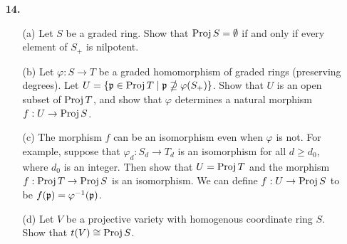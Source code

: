 \documentclass{article}
\begin{document}
\begin{enumerate} [label=\textbf{\arabic*.}, leftmargin=0em]
\begin{proof}
\begin{itemize} [leftmargin=0cm]
        \item[(b)] Let $\{ U_i \}_{i \in I}$ be an open cover of $\spec{A}$. We can assume $U_i$ to be basic open sets of the form $D(f_i)$ for some $f_i \in A$. If $\spec{A} = \bigcup D(f_i)$, then $V((f_i)_{i \in I}) = \emptyset$, which implies the ideal generated by $f_i$ is the entire ring $A$. That means there exists a finite number of elements $f_1, \dots f_n$ such that $\sum_{i = 1}^n a_i f_i = 1$ for some $a_i \in A$, hence $D(f_1), \dots, D(f_n)$ is a finite subcover of $\spec{A}$.

        \item[(c)] The descending chain of irreducible closed subsets in $\text{sp}(\spec{A})$ corresponds to an ascending chain of prime ideals in $A$. If $A$ is noetherian any ascending chain of ideals must terminate, hence the corresponding descending chain of irreducible closed subsets must terminate.

        \item[(d)] Let $A = \prod_{i = 1}^\infty k$, where $k$ is any field. The prime ideals of $A$ are of the form $\goth{p}_i = \cdots \times k \times 0 \times k \cdots$, so $\spec{A}$ has countably infinite number of points, and closed subsets of $\spec{A}$ are finite set of points. Hence, $\spec{A}$ is a noetherian topological space. However, $A$ itself is not noetherian, e.g. $0 \times 0 \times \cdots \subset k \times 0 \times 0 \times \cdots \subset k \times k \times 0 \times \cdots \subset \cdots$.
    \end{itemize}
\end{proof}

\item[\textbf{14.}]
\begin{itemize}
    \item[(a)] Let $S$ be a graded ring. Show that $\operatorname{Proj}{S} = \emptyset$ if and only if every element of $S_+$ is nilpotent.
    \item[(b)] Let $\varphi : S \to T$ be a graded homomorphism of graded rings (preserving degrees). Let $U = \{ \mathfrak{p} \in \operatorname{Proj}{T} \mid \mathfrak{p} \nsupseteq \varphi(S_+) \}$. Show that $U$ is an open subset of $\operatorname{Proj}{T}$, and show that $\varphi$ determines a natural morphism $f : U \to \operatorname{Proj}{S}$.
    \item[(c)] The morphism $f$ can be an isomorphism even when $\varphi$ is not. For example, suppose that $\varphi_d : S_d \to T_d$ is an isomorphism for all $d \geq d_0$, where $d_0$ is an integer. Then show that $U = \operatorname{Proj}{T}$ and the morphism $f : \operatorname{Proj}{T} \to \operatorname{Proj}{S}$ is an isomorphism. We can define $f : U \to \operatorname{Proj}{S}$ to be $f(\mathfrak{p}) = \varphi^{-1}(\mathfrak{p})$.
    \item[(d)] Let $V$ be a projective variety with homogenous coordinate ring $S$. Show that $t(V) \cong \operatorname{Proj}{S}$.
\end{itemize}


\end{enumerate}
\end{document}
